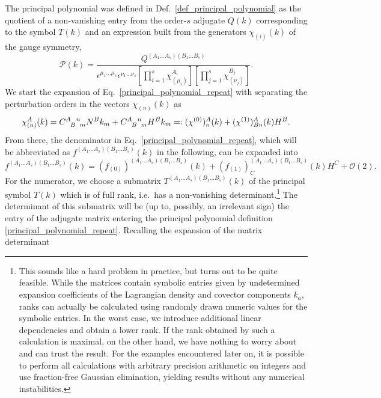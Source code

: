 The principal polynomial was defined in Def.~\ref{def_principal_polynomial} as the quotient of a non-vanishing entry from the order-$s$ adjugate $Q(k)$ corresponding to the symbol $T(k)$ and an expression built from the generators $\chi_{(i)}(k)$ of the gauge symmetry,
\begin{equation}\label{principal_polynomial_repeat}
    \mathcal P(k) = \frac{Q^{(A_1\dots A_s)(B_1\dots B_s)}}{\epsilon^{\mu_1\dots\mu_s}\epsilon^{\nu_1\dots\nu_s}\left\lbrack\prod_{i=1}^s\chi_{(\mu_i)}^{A_i}\right\rbrack\left\lbrack\prod_{j=1}^s\chi_{(\nu_j)}^{B_j}\right\rbrack}.
\end{equation}
We start the expansion of Eq.~\ref{principal_polynomial_repeat} with separating the perturbation orders in the vectors $\chi_{(n)}(k)$ as 
\begin{equation}
  \chi_{(n)}^A(k) = \gmc{A}{B}{n}{m}N^Bk_m + \gmc{A}{B}{n}{m}H^Bk_m =\vcentcolon (\chi^{(0)})^A_n(k) + (\chi^{(1)})^A_{Bn}(k)H^B.
\end{equation}
From there, the denominator in Eq.~\ref{principal_polynomial_repeat}, which will be abbreviated as $f^{(A_1\dots A_s)(B_1\dots B_s)}(k)$ in the following, can be expanded into
\begin{equation}\label{expansion_f}
  f^{(A_1\dots A_s)(B_1\dots B_s)}(k) = (f_{(0)})^{(A_1\dots A_s)(B_1\dots B_s)}(k) + (f_{(1)})^{(A_1\dots A_s)(B_1\dots B_s)}_C(k)H^C + \mathcal O(2).
\end{equation}
For the numerator, we choose a submatrix $T^{(A_1\dots A_s)(B_1\dots B_s)}(k)$ of the principal symbol $T(k)$ which is of full rank, i.e.~has a non-vanishing determinant.\footnote{This sounds like a hard problem in practice, but turns out to be quite feasible. While the matrices contain symbolic entries given by undetermined expansion coefficients of the Lagrangian density and covector components $k_a$, ranks can actually be calculated using randomly drawn numeric values for the symbolic entries. In the worst case, we introduce additional linear dependencies and obtain a lower rank. If the rank obtained by such a calculation is maximal, on the other hand, we have nothing to worry about and can trust the result. For the examples encountered later on, it is possible to perform all calculations with arbitrary precision arithmetic on integers and use fraction-free Gaussian elimination, yielding results without any numerical instabilities.}
The determinant of this submatrix will be (up to, possibly, an irrelevant sign) the entry of the adjugate matrix entering the principal polynomial definition \eqref{principal_polynomial_repeat}. Recalling the expansion of the matrix determinant
